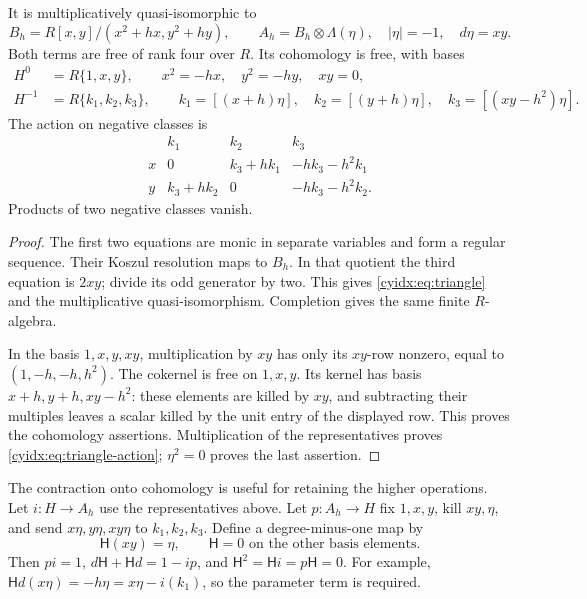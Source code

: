 \begin{theorem}\label{cyidx:thm:triangle}
It is multiplicatively quasi-isomorphic to
\begin{equation}\label{cyidx:eq:triangle}
 B_h=R[x,y]/(x^2+hx,y^2+hy),\qquad
 A_h=B_h\otimes\Lambda(\eta),\quad |\eta|=-1,
 \quad d\eta=xy.
\end{equation}
Both terms are free of rank four over \(R\).
Its cohomology is free, with bases
\begin{align}
 H^0&=R\{1,x,y\},\qquad x^2=-hx,\quad y^2=-hy,\quad xy=0,
                   \label{cyidx:eq:H0}\\
 H^{-1}&=R\{k_1,k_2,k_3\},\qquad
 k_1=[(x+h)\eta],\quad k_2=[(y+h)\eta],\quad
 k_3=[(xy-h^2)\eta].\label{cyidx:eq:Hminus}
\end{align}
The action on negative classes is
\begin{equation}\label{cyidx:eq:triangle-action}
\begin{array}{c|ccc}
 &k_1&k_2&k_3\\\hline
 x&0&k_3+hk_1&-hk_3-h^2k_1\\
 y&k_3+hk_2&0&-hk_3-h^2k_2.
\end{array}
\end{equation}
Products of two negative classes vanish.
\end{theorem}
\begin{proof}
The first two equations are monic in separate variables
and form a regular sequence. Their Koszul resolution
maps to \(B_h\). In that quotient the third equation
is \(2xy\); divide its odd generator by two. This
gives \eqref{cyidx:eq:triangle} and the multiplicative
quasi-isomorphism. Completion gives the same finite
\(R\)-algebra.

In the basis \(1,x,y,xy\), multiplication by \(xy\)
has only its \(xy\)-row nonzero, equal to
\((1,-h,-h,h^2)\). The cokernel is free on
\(1,x,y\). Its kernel has basis
\(x+h,y+h,xy-h^2\): these elements are killed by
\(xy\), and subtracting their multiples leaves a
scalar killed by the unit entry of the displayed row.
This proves the cohomology assertions. Multiplication
of the representatives proves
\eqref{cyidx:eq:triangle-action}; \(\eta^2=0\)
proves the last assertion.
\end{proof}

The contraction onto cohomology is useful for retaining
the higher operations. Let \(i:H\to A_h\) use the
representatives above. Let \(p:A_h\to H\) fix
\(1,x,y\), kill \(xy,\eta\), and send
\(x\eta,y\eta,xy\eta\) to \(k_1,k_2,k_3\).
Define a degree-minus-one map by
\begin{equation}\label{cyidx:eq:contraction}
 \mathsf H(xy)=\eta,\qquad
 \mathsf H=0\text{ on the other basis elements}.
\end{equation}
Then \(pi=1\), \(d\mathsf H+\mathsf Hd=1-ip\),
and \(\mathsf H^2=\mathsf Hi=p\mathsf H=0\).
For example, \(\mathsf Hd(x\eta)=-h\eta
=x\eta-i(k_1)\), so the parameter term is required.

